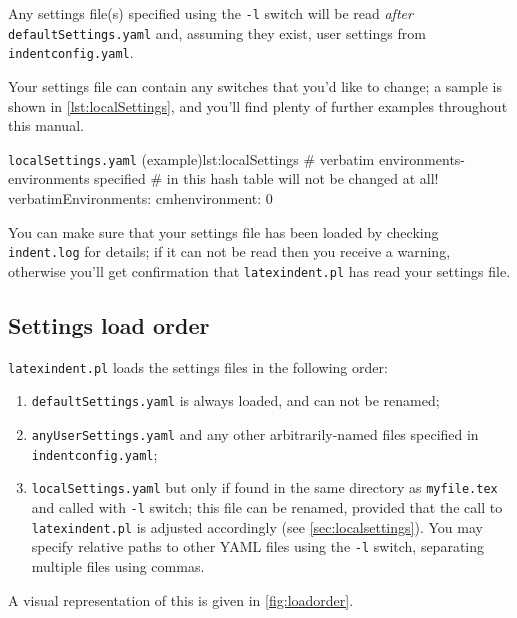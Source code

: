 Any settings file(s) specified using the \texttt{-l} switch will be read \emph{after} \texttt{defaultSettings.yaml} and, assuming they exist,
	user settings from \texttt{indentconfig.yaml}.

	Your settings file can contain any switches that you'd
	like to change; a sample is shown in \cref{lst:localSettings}, and you'll find plenty of further examples throughout this manual.

	\begin{yaml}{\texttt{localSettings.yaml} (example)}{lst:localSettings}
#  verbatim environments- environments specified
#  in this hash table will not be changed at all!
verbatimEnvironments:
    cmhenvironment: 0
\end{yaml}

	You can make sure that your settings file has been loaded by checking \texttt{indent.log}
	for details; if it can not be read then you receive a warning, otherwise you'll get confirmation that
	\texttt{latexindent.pl} has read your settings file.

\subsection{Settings load order}\label{sec:loadorder}
	\texttt{latexindent.pl} loads the settings files in the following order:
	\begin{enumerate}
		\item \texttt{defaultSettings.yaml} is always loaded, and can not be renamed;
		\item \texttt{anyUserSettings.yaml} and any other arbitrarily-named files specified in \texttt{indentconfig.yaml};
		\item \texttt{localSettings.yaml} but only if found in the same directory as \texttt{myfile.tex} and called
		      with \texttt{-l} switch; this file can be renamed, provided that the call to \texttt{latexindent.pl} is adjusted
		      accordingly (see \cref{sec:localsettings}). You may specify relative  paths to other
		      YAML files using the \texttt{-l} switch, separating multiple files using commas.
	\end{enumerate}
	A visual representation of this is given in \cref{fig:loadorder}.

